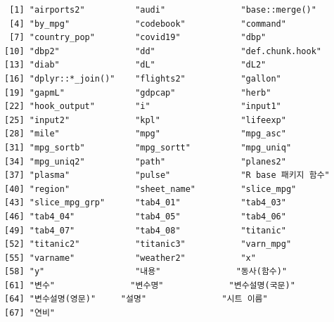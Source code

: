\documentclass[
  11pt,
]{krantz}
\newenvironment{Shaded}{\begin{snugshade}}{\end{snugshade}}
\newcommand{\CommentTok}[1]{\textcolor[rgb]{0.37,0.37,0.37}{\textit{#1}}}
\newcommand{\ControlFlowTok}[1]{\textcolor[rgb]{0.27,0.27,0.27}{\textbf{#1}}}
\newcommand{\DataTypeTok}[1]{\textcolor[rgb]{0.27,0.27,0.27}{#1}}
\newcommand{\DecValTok}[1]{\textcolor[rgb]{0.06,0.06,0.06}{#1}}
\newcommand{\KeywordTok}[1]{\textcolor[rgb]{0.27,0.27,0.27}{\textbf{#1}}}
\newcommand{\NormalTok}[1]{#1}
\newcommand{\OperatorTok}[1]{\textcolor[rgb]{0.43,0.43,0.43}{\textbf{#1}}}
\newcommand{\StringTok}[1]{\textcolor[rgb]{0.5,0.5,0.5}{#1}}
\begin{document}
\begin{Shaded}
\end{Shaded}

\begin{verbatim}
 [1] "airports2"          "audi"               "base::merge()"     
 [4] "by_mpg"             "codebook"           "command"           
 [7] "country_pop"        "covid19"            "dbp"               
[10] "dbp2"               "dd"                 "def.chunk.hook"    
[13] "diab"               "dL"                 "dL2"               
[16] "dplyr::*_join()"    "flights2"           "gallon"            
[19] "gapmL"              "gdpcap"             "herb"              
[22] "hook_output"        "i"                  "input1"            
[25] "input2"             "kpl"                "lifeexp"           
[28] "mile"               "mpg"                "mpg_asc"           
[31] "mpg_sortb"          "mpg_sortt"          "mpg_uniq"          
[34] "mpg_uniq2"          "path"               "planes2"           
[37] "plasma"             "pulse"              "R base 패키지 함수"
[40] "region"             "sheet_name"         "slice_mpg"         
[43] "slice_mpg_grp"      "tab4_01"            "tab4_03"           
[46] "tab4_04"            "tab4_05"            "tab4_06"           
[49] "tab4_07"            "tab4_08"            "titanic"           
[52] "titanic2"           "titanic3"           "varn_mpg"          
[55] "varname"            "weather2"           "x"                 
[58] "y"                  "내용"               "동사(함수)"        
[61] "변수"               "변수명"             "변수설명(국문)"    
[64] "변수설명(영문)"     "설명"               "시트 이름"         
[67] "연비"              
\end{verbatim}
\end{document}
